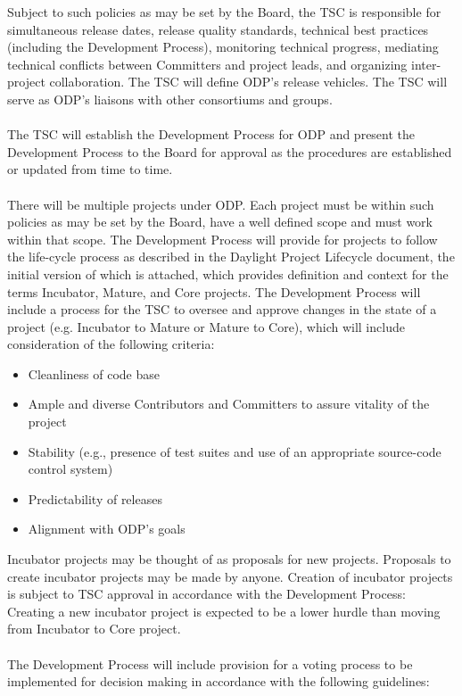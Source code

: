 \documentclass[a4paper, 12pt]{book}
\begin{document}
{
Subject to such policies as may be set by the Board, the TSC is responsible for simultaneous release dates, release quality standards,  technical best practices (including the Development Process), monitoring technical progress, mediating technical conflicts between Committers and project leads, and organizing inter-project collaboration. The TSC will define ODP’s release vehicles.  The TSC will serve as ODP’s liaisons with other consortiums and groups.\\
\\
The TSC will establish the Development Process for ODP and present the Development Process to the Board for approval as the procedures are established or updated from time to time.\\
\\
There will be multiple projects under ODP.  Each project must be within such policies as may be set by the Board, have a well defined scope and must work within that scope.  The Development Process will provide for projects to follow the life-cycle process as described in the Daylight Project Lifecycle document, the initial version of which is attached, which provides definition and context for the terms Incubator, Mature, and Core projects.  The Development Process will include a process for the TSC to oversee and approve changes in the state of a project (e.g. Incubator to Mature or Mature to Core), which will include consideration of the following criteria:
\begin{itemize}\itemsep0pt
\item{Cleanliness of code base}
\item{Ample and diverse Contributors and Committers to assure vitality of the project}
\item{Stability (e.g., presence of test suites and use of an appropriate source-code control system)}
\item{Predictability of releases}
\item{Alignment with ODP’s goals}
\end{itemize}
Incubator projects may be thought of as proposals for new projects.  Proposals to create incubator projects may be made by anyone. Creation of incubator projects is subject to TSC approval in accordance with the Development Process: Creating a new incubator project is expected to be a lower hurdle than moving from Incubator to Core project.\\
\\
The Development Process will include provision for a voting process to be implemented for decision making in accordance with the following guidelines:
}
\end{document}
